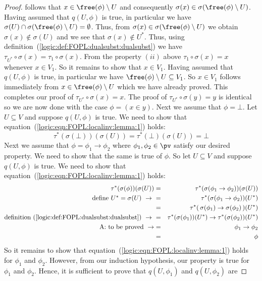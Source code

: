 \begin{proof}
follows that $x\in\free(\phi)\setminus U$ and consequently
$\sigma(x)\in\sigma(\free(\phi)\setminus U)$. Having assumed that
$q(U,\phi)$ is true, in particular we have
$\sigma(U)\cap\sigma(\free(\phi)\setminus U)=\emptyset$. Thus, from
$\sigma(x)\in\sigma(\free(\phi)\setminus U)$ we obtain
$\sigma(x)\not\in\sigma(U)$ and we see that $\sigma(x)\not\in U^{*}$.
Thus, using definition~(\ref{logic:def:FOPL:dualsubst:dualsubst}) we
have $\tau_{U^{*}}\circ\sigma(x)=\tau_{1}\circ\sigma(x)$. From the
property $(ii)$ above $\tau_{1}\circ\sigma(x)=x$ whenever
$x\in V_{1}$. So it remains to show that $x\in V_{1}$. Having
assumed that $q(U,\phi)$ is true, in particular we have
$\free(\phi)\setminus U\subseteq V_{1}$. So $x\in V_{1}$ follows
immediately from $x\in\free(\phi)\setminus U$ which we have already
proved. This completes our proof of $\tau_{U^{*}}\circ\sigma(x)=x$.
The proof of $\tau_{U^{*}}\circ\sigma(y)=y$ is identical so we are
now done with the case $\phi=(x\in y)$. Next we assume that
$\phi=\bot$. Let $U\subseteq V$ and suppose $q(U,\phi)$ is true. We
need to show that equation~(\ref{logic:eqn:FOPL:localinv:lemma:1})
holds:
    \[
    \tau^{*}(\sigma(\bot))(\sigma(U))
    =\tau^{*}(\bot)(\sigma(U))=\bot
    \]
Next we assume that $\phi=\phi_{1}\to\phi_{2}$ where
$\phi_{1},\phi_{2}\in\pv$ satisfy our desired property. We need to
show that the same is true of $\phi$. So let $U\subseteq V$ and
suppose $q(U,\phi)$ is true. We need to show that
equation~(\ref{logic:eqn:FOPL:localinv:lemma:1}) holds:
    \begin{eqnarray*}\tau^{*}(\sigma(\phi))(\sigma(U))
        &=&\tau^{*}(\sigma(\phi_{1}\to\phi_{2}))(\sigma(U))\\
        \mbox{define $U^{*}=\sigma(U)$}\ \to\ 
        &=&\tau^{*}(\sigma(\phi_{1}\to\phi_{2}))(U^{*})\\
        &=&\tau^{*}(\,\sigma(\phi_{1})\to\sigma(\phi_{2})\,)(U^{*})\\
        \mbox{definition~(\ref{logic:def:FOPL:dualsubst:dualsubst})}\ \to\ 
        &=&\tau^{*}(\sigma(\phi_{1}))(U^{*})\to\tau^{*}(\sigma(\phi_{2}))(U^{*})\\
        \mbox{A: to be proved}\ \rightarrow&=&\phi_{1}\to\phi_{2}\\
        &=&\phi
    \end{eqnarray*}
So it remains to show that
equation~(\ref{logic:eqn:FOPL:localinv:lemma:1}) holds for
$\phi_{1}$ and $\phi_{2}$. However, from our induction hypothesis,
our property is true for $\phi_{1}$ and $\phi_{2}$. Hence, it is
sufficient to prove that $q(U,\phi_{1})$ and $q(U,\phi_{2})$ are

\end{proof}
